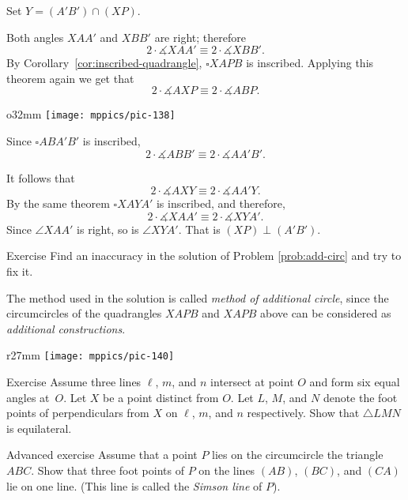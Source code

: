 Set $Y=(A'B')\cap (XP)$.

Both angles $XAA'$ and $XBB'$ are right;
therefore
\[2\cdot\measuredangle XAA'
\equiv
2\cdot\measuredangle XBB'.\]
By Corollary~\ref{cor:inscribed-quadrangle},  $\square XAPB$ is inscribed.
Applying this theorem again we get that
\[2\cdot\measuredangle AXP
\equiv
2\cdot\measuredangle ABP.\]

\begin{wrapfigure}[9]{o}{32mm}
\vskip-7mm
\centering
\texttt{[image: mppics/pic-138]}
\end{wrapfigure}

Since $\square ABA'B'$ is inscribed, 
\[2\cdot\measuredangle ABB'
\equiv
2\cdot\measuredangle AA'B'.\]

It follows that 
\[2\cdot\measuredangle AXY
\equiv
2\cdot\measuredangle AA'Y.\]
By the same theorem $\square XAYA'$ is inscribed,
and
therefore, 
\[2\cdot\measuredangle XAA'
\equiv
2\cdot\measuredangle XYA'.\]
Since $\angle XAA'$ is right, 
so is $\angle XYA'$. 
That is $(XP)\perp(A'B')$.
\qeds

\begin{thm}{Exercise}\label{ex:inaccuracy}
Find an inaccuracy in the solution of Problem \ref{prob:add-circ} and try to fix it.
\end{thm}

The method used in the solution 
is called {}\emph{method of additional circle},
since the circumcircles of the quadrangles $XAPB$ and $XAPB$ 
 above can be considered as {}\emph{additional constructions}. 

{

\begin{wrapfigure}{r}{27mm}
\vskip-8mm
\centering
\texttt{[image: mppics/pic-140]}
\end{wrapfigure}

\begin{thm}{Exercise}\label{ex:equilateral-2}
Assume three lines $\ell$, $m$, and $n$ intersect at point $O$ and form six equal angles at~$O$. 
Let $X$ be a point distinct from $O$.
Let $L$, $M$, and $N$ denote the foot points of perpendiculars from $X$ on $\ell$, $m$, and $n$ respectively.
Show that $\triangle LMN$ is equilateral.
\end{thm}
}

\begin{thm}{Advanced exercise}\label{ex:simson}
Assume that a point $P$ lies on the circumcircle the triangle $ABC$.
Show that three foot points of $P$ on the lines $(AB)$, $(BC)$, and $(CA)$ lie on one line.
(This line is called the \emph{Simson line} of $P$).
\end{thm}

